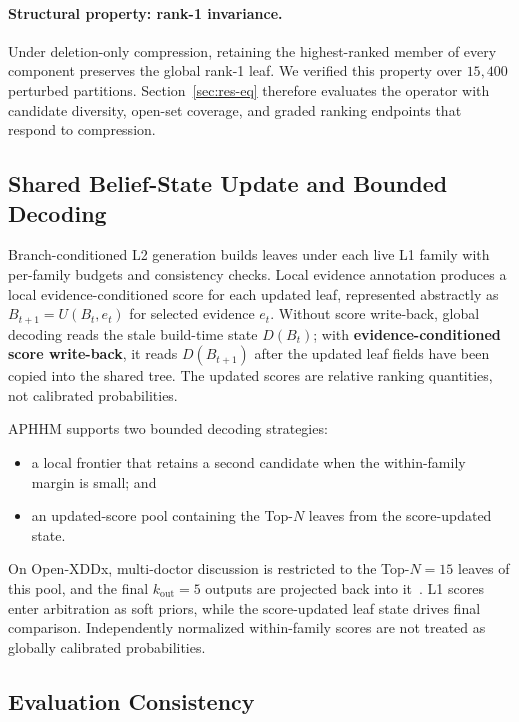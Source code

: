 \documentclass[letterpaper]{article} %
\begin{document}
\paragraph{Structural property: rank-1 invariance.}
Under deletion-only compression, retaining the highest-ranked member of every component preserves the global rank-1 leaf.
We verified this property over $15{,}400$ perturbed partitions.
Section~\ref{sec:res-eq} therefore evaluates the operator with candidate diversity, open-set coverage, and graded ranking endpoints that respond to compression.

\subsection{Shared Belief-State Update and Bounded Decoding}
\label{sec:m4}
\label{sec:m5}

Branch-conditioned L2 generation builds leaves under each live L1 family with per-family budgets and consistency checks.
Local evidence annotation produces a local evidence-conditioned score for each updated leaf, represented abstractly as $B_{t+1}=U(B_t,e_t)$ for selected evidence $e_t$.
Without score write-back, global decoding reads the stale build-time state $D(B_t)$; with \textbf{evidence-conditioned score write-back}, it reads $D(B_{t+1})$ after the updated leaf fields have been copied into the shared tree.
The updated scores are relative ranking quantities, not calibrated probabilities.

APHHM supports two bounded decoding strategies:
\begin{itemize}
  \item a local frontier that retains a second candidate when the within-family margin is small; and
  \item an updated-score pool containing the Top-$N$ leaves from the score-updated state.
\end{itemize}
On Open-XDDx, multi-doctor discussion is restricted to the Top-$N{=}15$ leaves of this pool, and the final $k_{\mathrm{out}}{=}5$ outputs are projected back into it~\cite{chen2025mac,mac2026}.
L1 scores enter arbitration as soft priors, while the score-updated leaf state drives final comparison.
Independently normalized within-family scores are not treated as globally calibrated probabilities.

\subsection{Evaluation Consistency}
\label{sec:protocol}
\end{document}
